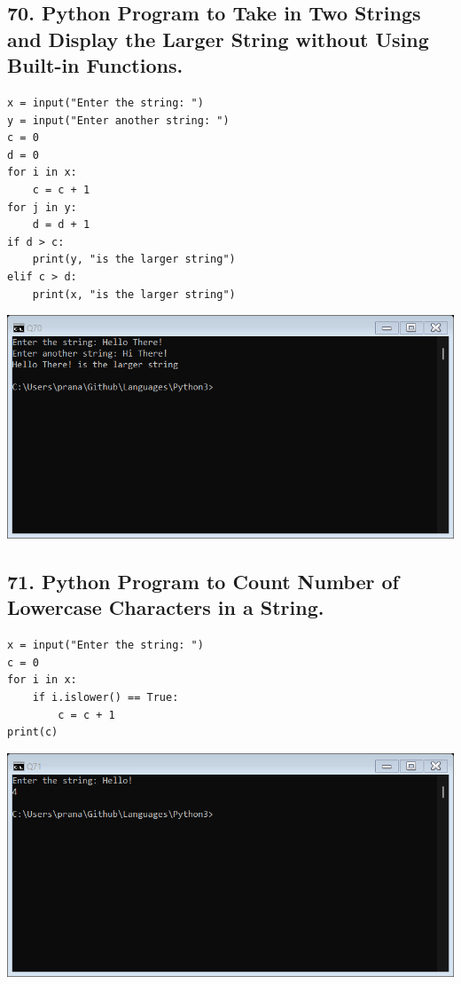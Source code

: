 \documentclass[12pt]{article}
\begin{document}
\subsection*{70. Python Program to Take in Two Strings and Display the Larger String without Using Built-in Functions.}
\begin{verbatim}
x = input("Enter the string: ")
y = input("Enter another string: ")
c = 0
d = 0
for i in x:
    c = c + 1
for j in y:
    d = d + 1
if d > c:
    print(y, "is the larger string")
elif c > d:
    print(x, "is the larger string")
\end{verbatim}
\includegraphics[width=\linewidth]{images/70.png}

\subsection*{71. Python Program to Count Number of Lowercase Characters in a String.}
\begin{verbatim}
x = input("Enter the string: ")
c = 0
for i in x:
    if i.islower() == True:
        c = c + 1
print(c)
\end{verbatim}
\includegraphics[width=\linewidth]{images/71.png}
\end{document}
